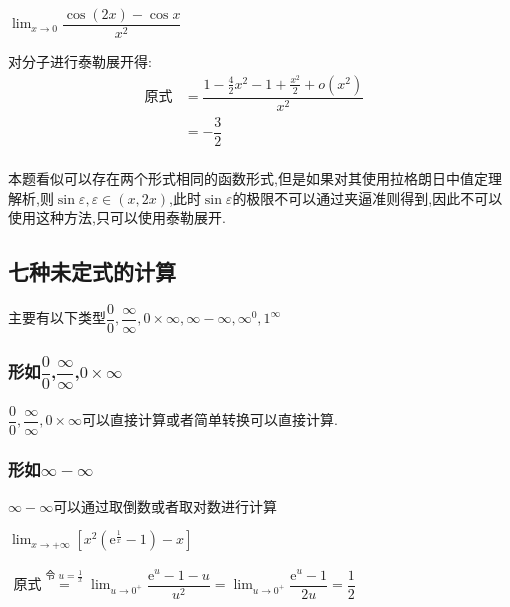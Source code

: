 \documentclass[9pt a4paper, oneside, UTF8]{ctexbook}
\begin{document}
\begin{sloppypar}
    \begin{problem}
        $\lim_{x\to 0}\dfrac{\cos(2x)-\cos x}{x^2}$
    \end{problem}
    \begin{solution}
        对分子进行泰勒展开得:
        \begin{align*}
            \text{原式} & = \dfrac{1-\frac{4}{2}x^2-1+\frac{x^2}{2}+o(x^2)}{x^2} & \\
            & = -\dfrac{3}{2} & \\
        \end{align*}
    \end{solution}
    \begin{note}
        本题看似可以存在两个形式相同的函数形式,但是如果对其使用拉格朗日中值定理解析,则$\sin \varepsilon,\varepsilon \in (x,2x)$,此时$\sin \varepsilon$的极限不可以通过夹逼准则得到,因此不可以使用这种方法,只可以使用泰勒展开.
    \end{note}
    \subsection{七种未定式的计算}
    主要有以下类型$\dfrac{0}{0},\dfrac{\infty}{\infty},0 \times \infty,\infty -\infty,\infty ^0,1^\infty$
    \subsubsection{形如$\dfrac{0}{0}$,$\dfrac{\infty}{\infty}$,$0 \times \infty$}
         $\dfrac{0}{0},\dfrac{\infty}{\infty},0 \times \infty$可以直接计算或者简单转换可以直接计算.
    \subsubsection{形如$\infty -\infty$}
          $\infty -\infty$可以通过取倒数或者取对数进行计算
              \begin{problem}
              $\lim_{x\to+\infty}\left[x^2\left(\mathrm{e}^{\frac{1}{x}}-1\right)-x\right]$
              \end{problem}
              \begin{solution}
                  $
                      \begin{aligned}
                          \text{原式}\overset{\text{令 }u=\frac1x}{\operatorname*{=}}\lim_{u\to0^+}\dfrac{\mathrm{e}^u-1-u}{u^2}=\lim_{u\to0^+}\dfrac{\mathrm{e}^u-1}{2u}=\dfrac12
                      \end{aligned}
                  $
              \end{solution}

\end{sloppypar}
\end{document}

